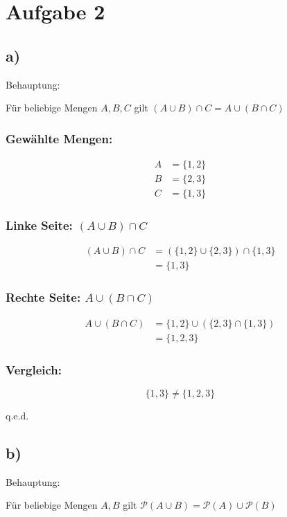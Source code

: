 \documentclass{article}
\begin{document}
\section*{Aufgabe 2}

\subsection*{a)}
Behauptung: 

Für beliebige Mengen $A, B, C$ gilt 
 $(A \cup B) \cap C = A \cup (B \cap C)$

\subsubsection*{Gewählte Mengen:}
\begin{align*}
A &= \{1,2\} \\
B &= \{2,3\} \\
C &= \{1,3\}
\end{align*}

\subsubsection*{Linke Seite: $(A \cup B) \cap C$}
\begin{align*}
	(A \cup B) \cap C &= (\{1,2\} \cup \{2,3\}) \cap \{1,3\} \\
	&= \{1,3\}
\end{align*}

\subsubsection*{Rechte Seite: $A \cup (B \cap C)$}
\begin{align*}
	A \cup (B \cap C) &= \{1,2\} \cup (\{2,3\} \cap \{1,3\}) \\
	&= \{1,2,3\}
\end{align*}

\subsubsection*{Vergleich:}
$$\{1, 3\} \neq \{1, 2, 3\}$$

q.e.d.

\subsection*{b)}
Behauptung: 

Für beliebige Mengen $A, B$ gilt 
$\mathcal{P}(A \cup B) = \mathcal{P}(A) \cup \mathcal{P}(B)$
\end{document}
